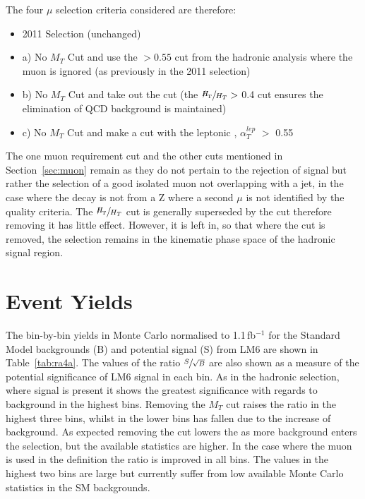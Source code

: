 The four $\mu$ selection criteria considered are therefore:

\begin{itemize}
\item 2011 Selection (unchanged)
\item a) No $M_{T}$ Cut and use the \alt $> 0.55$ cut from the hadronic analysis where the muon is ignored (as previously in the 2011 selection)
\item b) No $M_{T}$ Cut and take out the \alt cut (the $\sfrac{\MHT}{\HT} >$ 0.4 cut ensures the elimination of QCD background is maintained)
\item c) No $M_{T}$ Cut and make a cut with the leptonic \alt, $\alpha^{lep}_{T}$ $>$ 0.55
\end{itemize}

The one muon requirement cut and the other cuts mentioned in Section~\ref{sec:muon} remain as they do not pertain to the rejection of signal but rather the selection of a good isolated muon not overlapping with a jet, in the case where the decay is not from a Z where a second $\mu$ is not identified by the quality criteria. The $\sfrac{\MHT}{\HT}$ cut is generally superseded by the \alt cut therefore removing it has little effect. However, it is left in, so that where the \alt cut is removed, the selection remains in the kinematic phase space of the hadronic signal region. 

\section{Event Yields}

The bin-by-bin yields in Monte Carlo normalised to 1.1\,fb$^{-1}$ for the Standard Model backgrounds (B) and potential signal (S) from LM6 are shown in Table~\ref{tab:ra4a}. The values of the ratio $\sfrac{S}{\sqrt{B}}$ are also shown as a measure of the potential significance of LM6 signal in each bin. As in the hadronic selection, where signal is present it shows the greatest significance with regards to background in the highest \HT bins. Removing the $M_{T}$ cut raises the ratio \srb in the highest three bins, whilst in the lower bins \srb has fallen due to the increase of background. As expected removing the \alt cut lowers the \srb as more background enters the selection, but the available statistics are higher. In the case where the muon is used in the \alt definition the ratio is improved in all bins. The values in the highest two bins are large but currently suffer from low available Monte Carlo statistics in the SM backgrounds. 

